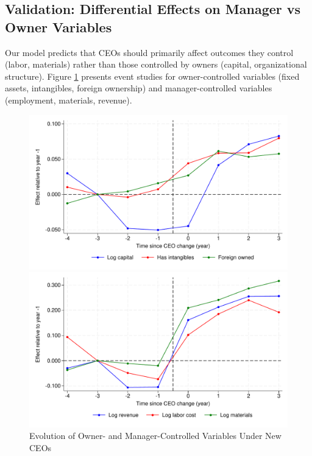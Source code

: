 \documentclass[11pt,a4paper]{article}
\begin{document}
\subsection{Validation: Differential Effects on Manager vs Owner Variables}

Our model predicts that CEOs should primarily affect outcomes they control (labor, materials) rather than those controlled by owners (capital, organizational structure). Figure \ref{fig:owner_manager_control} presents event studies for owner-controlled variables (fixed assets, intangibles, foreign ownership) and manager-controlled variables (employment, materials, revenue).

\begin{figure}[htbp]
\centering
\begin{minipage}{0.45\textwidth}
\includegraphics[width=\textwidth]{figure/event_study_owner_controlled.pdf}
\end{minipage}
\begin{minipage}{0.45\textwidth}
\includegraphics[width=\textwidth]{figure/event_study_manager_controlled.pdf}
\end{minipage}
\label{fig:owner_manager_control}
\caption{Evolution of Owner- and Manager-Controlled Variables Under New CEOs}
\end{figure}
\end{document}

